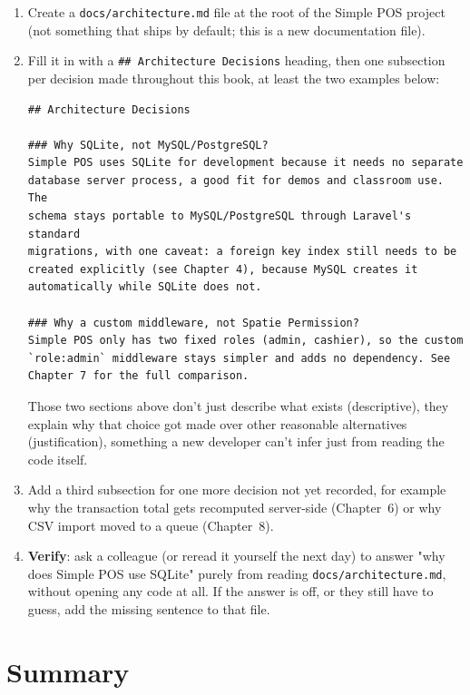 \begin{enumerate}
  \item Create a \texttt{docs/architecture.md} file at the root of the
    Simple POS project (not something that ships by default; this is a
    new documentation file).
  \item Fill it in with a \texttt{\#\# Architecture Decisions} heading,
    then one subsection per decision made throughout this book, at
    least the two examples below:
    \begin{lstlisting}[language={}, title=\lstfile{docs/architecture.md}]
## Architecture Decisions

### Why SQLite, not MySQL/PostgreSQL?
Simple POS uses SQLite for development because it needs no separate
database server process, a good fit for demos and classroom use. The
schema stays portable to MySQL/PostgreSQL through Laravel's standard
migrations, with one caveat: a foreign key index still needs to be
created explicitly (see Chapter 4), because MySQL creates it
automatically while SQLite does not.

### Why a custom middleware, not Spatie Permission?
Simple POS only has two fixed roles (admin, cashier), so the custom
`role:admin` middleware stays simpler and adds no dependency. See
Chapter 7 for the full comparison.
    \end{lstlisting}
    Those two sections above don't just describe what exists
    (descriptive), they explain why that choice got made over other
    reasonable alternatives (justification), something a new developer
    can't infer just from reading the  code
    itself.
  \item Add a third subsection for one more decision not yet recorded,
    for example why the transaction total gets recomputed server-side
    (Chapter~6) or why CSV import moved to a queue (Chapter~8).
  \item \textbf{Verify}: ask a colleague (or reread it yourself the
    next day) to answer "why does Simple POS use SQLite" purely from
    reading \texttt{docs/architecture.md}, without opening any code at
    all. If the answer is off, or they still have to guess, add the
    missing sentence to that file.
\end{enumerate}


\section{Summary}
\label{sec:optimasi-dan-deployment-rangkuman}

